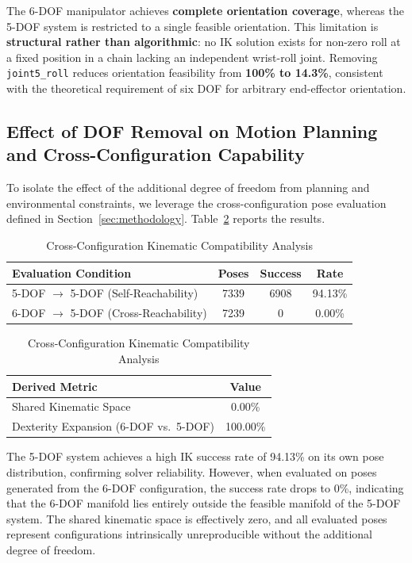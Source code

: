 \documentclass[conference]{IEEEtran}
\begin{document}
	The 6-DOF manipulator achieves \textbf{complete orientation coverage},
	whereas the 5-DOF system is restricted to a single feasible
	orientation. This limitation is \textbf{structural rather than
		algorithmic}: no IK solution exists for non-zero roll at a fixed
	position in a chain lacking an independent wrist-roll joint.
	Removing \texttt{joint5\_roll} reduces orientation feasibility from
	\textbf{100\% to 14.3\%}, consistent with the theoretical requirement
	of six DOF for arbitrary end-effector orientation.
	
	\subsection{Effect of DOF Removal on Motion Planning and
		Cross-Configuration Capability}
	
	To isolate the effect of the additional degree of freedom from
	planning and environmental constraints, we leverage the
	cross-configuration pose evaluation defined in
	Section~\ref{sec:methodology}. Table~\ref{tab:kinematic_ablation}
	reports the results.
	
	\begin{table}[t]
		\centering
		\caption{Cross-Configuration Kinematic Compatibility Analysis}
		\label{tab:kinematic_ablation}
		\begin{tabular}{l|c|c|c}
			\hline
			\textbf{Evaluation Condition} & \textbf{Poses} & \textbf{Success} & \textbf{Rate} \\
			\hline
			5-DOF $\rightarrow$ 5-DOF (Self-Reachability) & 7339 & 6908 & 94.13\% \\
			6-DOF $\rightarrow$ 5-DOF (Cross-Reachability) & 7239 & 0 & 0.00\% \\
			\hline
		\end{tabular}
		
		\vspace{2mm}
		
		\begin{tabular}{l|c}
			\hline
			\textbf{Derived Metric} & \textbf{Value} \\
			\hline
			Shared Kinematic Space & 0.00\% \\
			Dexterity Expansion (6-DOF vs.\ 5-DOF) & 100.00\% \\
			\hline
		\end{tabular}
	\end{table}
	
	The 5-DOF system achieves a high IK success rate of 94.13\% on its
	own pose distribution, confirming solver reliability. However, when
	evaluated on poses generated from the 6-DOF configuration, the success
	rate drops to 0\%, indicating that the 6-DOF manifold lies entirely
	outside the feasible manifold of the 5-DOF system. The shared
	kinematic space is effectively zero, and all evaluated poses represent
	configurations intrinsically unreproducible without the additional
	degree of freedom.
	
\end{document}
